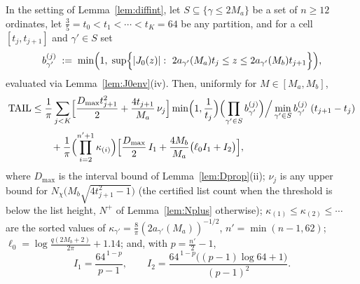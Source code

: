 \begin{lemma}\label{lem:tailexp}
In the setting of Lemma~\ref{lem:diffint}, let
$S\subseteq\{\gamma\le2M_a\}$ be a set of $n\ge12$ ordinates, let
$\tfrac35=t_0<t_1<\cdots<t_K=64$ be any partition, and for a cell
$[t_j,t_{j+1}]$ and $\gamma'\in S$ set
\[
b_{\gamma'}^{(j)}\;:=\;\min\Bigl(1,\;
\sup\Bigl\{|J_0(z)|:\ 2a_{\gamma'}(M_a)t_j\le z\le
2a_{\gamma'}(M_b)t_{j+1}\Bigr\}\Bigr),
\]
evaluated via Lemma~\ref{lem:J0env}(iv). Then, uniformly for
$M\in[M_a,M_b]$,
\begin{align}
\mathrm{TAIL}
&\le\frac1\pi\sum_{j<K}
\Bigl[\frac{D_{\max}t_{j+1}^2}2
+\frac{4t_{j+1}}{M_a}\,\nu_j\Bigr]
\min\Bigl(1,\frac1{t_j}\Bigr)
\Bigl(\prod_{\gamma'\in S}b^{(j)}_{\gamma'}\Bigr)
\Big/\min_{\gamma'\in S}b^{(j)}_{\gamma'}
\;(t_{j+1}-t_j)
\notag\\[2pt]
&\qquad+\frac1\pi\Bigl(\prod_{i=2}^{n'+1}\kappa_{(i)}\Bigr)
\Bigl[\frac{D_{\max}}2\,I_1+\frac{4M_b}{M_a}\bigl(\ell_0I_1+I_2\bigr)
\Bigr],
\label{eq:tailexp}
\end{align}
where $D_{\max}$ is the interval bound of
Lemma~\ref{lem:Dprop}(ii);
$\nu_j$ is any upper bound for
$N_\chi\bigl(M_b\sqrt{4t_{j+1}^2-1}\bigr)$ (the certified list count
when the threshold is below the list height, $N^+$ of
Lemma~\ref{lem:Nplus} otherwise);
$\kappa_{(1)}\le\kappa_{(2)}\le\cdots$ are the sorted values of
$\kappa_{\gamma'}=\tfrac8\pi(2a_{\gamma'}(M_a))^{-1/2}$,
$n'=\min(n-1,62)$;
$\ell_0=\log\tfrac{q(2M_b+2)}{2\pi}+1.14$; and, with
$p=\tfrac{n'}2-1$,
\[
I_1=\frac{64^{\,1-p}}{p-1},\qquad
I_2=\frac{64^{\,1-p}\bigl((p-1)\log64+1\bigr)}{(p-1)^2}.
\]
\end{lemma}

